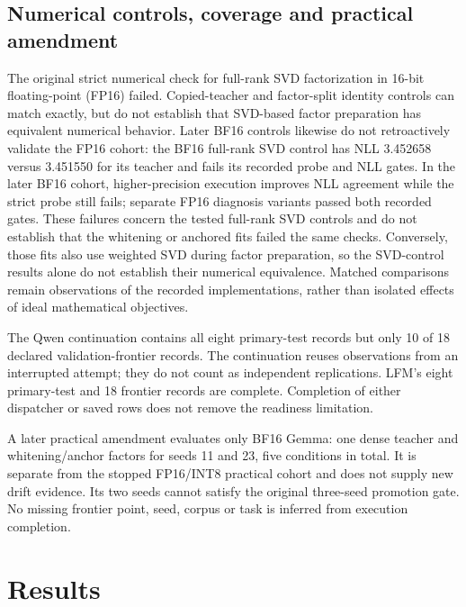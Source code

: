 \documentclass[conference]{IEEEtran}
\begin{document}
\subsection{Numerical controls, coverage and practical amendment}
The original strict numerical check for full-rank SVD factorization in 16-bit floating-point (FP16) failed. Copied-teacher and factor-split identity controls can match exactly, but do not establish that SVD-based factor preparation has equivalent numerical behavior. Later BF16 controls likewise do not retroactively validate the FP16 cohort: the BF16 full-rank SVD control has NLL 3.452658 versus 3.451550 for its teacher and fails its recorded probe and NLL gates. In the later BF16 cohort, higher-precision execution improves NLL agreement while the strict probe still fails; separate FP16 diagnosis variants passed both recorded gates. These failures concern the tested full-rank SVD controls and do not establish that the whitening or anchored fits failed the same checks. Conversely, those fits also use weighted SVD during factor preparation, so the SVD-control results alone do not establish their numerical equivalence. Matched comparisons remain observations of the recorded implementations, rather than isolated effects of ideal mathematical objectives.\par\smallskip
The Qwen continuation contains all eight primary-test records but only 10 of 18 declared validation-frontier records. The continuation reuses observations from an interrupted attempt; they do not count as independent replications. LFM's eight primary-test and 18 frontier records are complete. Completion of either dispatcher or saved rows does not remove the readiness limitation.\par\smallskip
A later practical amendment evaluates only BF16 Gemma: one dense teacher and whitening/anchor factors for seeds 11 and 23, five conditions in total. It is separate from the stopped FP16/INT8 practical cohort and does not supply new drift evidence. Its two seeds cannot satisfy the original three-seed promotion gate. No missing frontier point, seed, corpus or task is inferred from execution completion.\par\smallskip
\section{Results}
\end{document}
